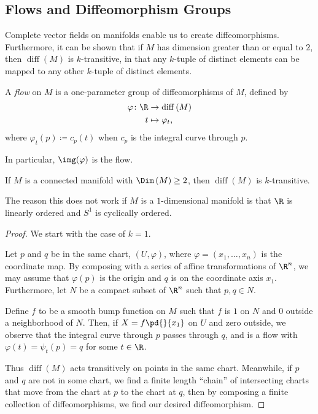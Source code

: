 \documentclass[10pt]{mypackage}
\begin{document}
\subsection{Flows and Diffeomorphism Groups}%
Complete vector fields on manifolds enable us to create diffeomorphisms. Furthermore, it can be shown that if $M$ has dimension greater than or equal to $2$, then $\operatorname{diff}\left( M \right)$ is $k$-transitive, in that any $k$-tuple of distinct elements can be mapped to any other $k$-tuple of distinct elements.
\begin{definition}
  A \textit{flow} on $M$ is a one-parameter group of diffeomorphisms of $M$, defined by
  \begin{align*}
    \varphi\colon \R &\rightarrow \operatorname{diff}\left( M \right)\\
    t &\mapsto \varphi_t,
  \end{align*}
  where $\varphi_t(p) \coloneq c_p(t)$ when $c_p$ is the integral curve through $p$.\newline

  In particular, $\img(\varphi)$ is the flow.
\end{definition}
\begin{proposition}
  If $M$ is a connected manifold with $\Dim\left( M \right) \geq 2$, then $\operatorname{diff}\left( M \right)$ is $k$-transitive.
\end{proposition}
\begin{remark}
  The reason this does not work if $M$ is a $1$-dimensional manifold is that $\R$ is linearly ordered and $S^{1}$ is cyclically ordered.
\end{remark}
\begin{proof}
  We start with the case of $k = 1$.\newline

  Let $p$ and $q$ be in the same chart, $\left( U,\varphi \right)$, where $\varphi = \left( x_1,\dots,x_n \right)$ is the coordinate map. By composing with a series of affine transformations of $\R^{n}$, we may assume that $\varphi(p)$ is the origin and $q$ is on the coordinate axis $x_1$. Furthermore, let $N$ be a compact subset of $\R^{n}$ such that $p,q\in N$.\newline

  Define $f$ to be a smooth bump function on $M$ such that $f$ is $1$ on $N$ and $0$ outside a neighborhood of $N$. Then, if $X = f \pd{}{x_1}$ on $U$ and zero outside, we observe that the integral curve through $p$ passes through $q$, and is a flow with $\varphi(t) = \psi_t(p) = q$ for some $t\in \R$.\newline

  Thus $\operatorname{diff}\left( M \right)$ acts transitively on points in the same chart. Meanwhile, if $p$ and $q$ are not in some chart, we find a finite length ``chain'' of intersecting charts that move from the chart at $p$ to the chart at $q$, then by composing a finite collection of diffeomorphisms, we find our desired diffeomorphism.
\end{proof}
\end{document}
